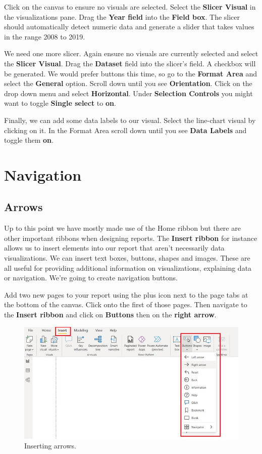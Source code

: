 \documentclass[
]{book}
\begin{document}
Click on the canvas to ensure no visuals are selected. Select the \textbf{Slicer Visual} in the visualizations pane. Drag the \textbf{Year field} into the \textbf{Field box}. The slicer should automatically detect numeric data and generate a slider that takes values in the range 2008 to 2019.

We need one more slicer. Again ensure no visuals are currently selected and select the \textbf{Slicer Visual}. Drag the \textbf{Dataset} field into the slicer's field. A checkbox will be generated. We would prefer buttons this time, so go to the \textbf{Format Area} and select the \textbf{General} option. Scroll down until you see \textbf{Orientation}. Click on the drop down menu and select \textbf{Horizontal}. Under \textbf{Selection Controls} you might want to toggle \textbf{Single select} to \textbf{on}.

Finally, we can add some data labels to our visual. Select the line-chart visual by clicking on it. In the Format Area scroll down until you see \textbf{Data Labels} and toggle them \textbf{on}.

\hypertarget{navigation}{%
\section{Navigation}\label{navigation}}

\hypertarget{arrows}{%
\subsection{Arrows}\label{arrows}}

Up to this point we have mostly made use of the Home ribbon but there are other important ribbons when designing reports. The \textbf{Insert ribbon} for instance allows us to insert elements into our report that aren't necessarily data visualizations. We can insert text boxes, buttons, shapes and images. These are all useful for providing additional information on visualizations, explaining data or navigation. We're going to create navigation buttons.

Add two new pages to your report using the plus icon next to the page tabs at the bottom of the canvas. Click onto the first of those pages. Then navigate to the \textbf{Insert ribbon} and click on \textbf{Buttons} then on the \textbf{right arrow}.

\begin{figure}
\centering
\includegraphics{bi11.jpg}
\caption{Inserting arrows.}
\end{figure}
\end{document}
